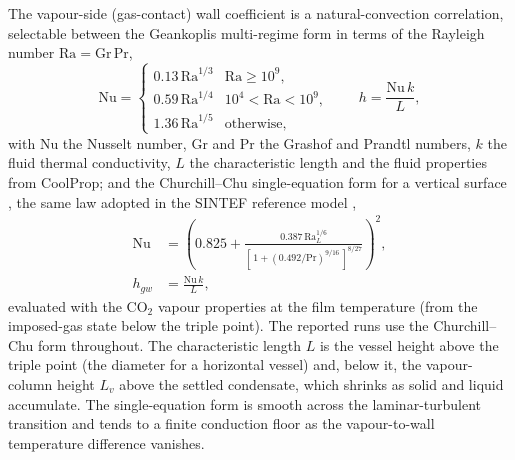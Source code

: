 \documentclass[5p,authoryear]{elsarticle}
\begin{document}
The vapour-side (gas-contact) wall coefficient is a natural-convection correlation, selectable
between the Geankoplis multi-regime form \citep{Geankoplis1993} in terms of the Rayleigh number
$\mathrm{Ra} = \mathrm{Gr}\,\mathrm{Pr}$,
\begin{equation}
\label{eq:geankoplis}
\mathrm{Nu} =
\begin{cases}
0.13\,\mathrm{Ra}^{1/3} & \mathrm{Ra} \ge 10^9,\\[2pt]
0.59\,\mathrm{Ra}^{1/4} & 10^4 < \mathrm{Ra} < 10^9,\\[2pt]
1.36\,\mathrm{Ra}^{1/5} & \text{otherwise},
\end{cases}
\qquad h = \frac{\mathrm{Nu}\,k}{L},
\end{equation}
with $\mathrm{Nu}$ the Nusselt number, $\mathrm{Gr}$ and $\mathrm{Pr}$ the Grashof and Prandtl
numbers, $k$ the fluid thermal conductivity, $L$ the characteristic length and the fluid properties
from CoolProp; and the Churchill--Chu single-equation form for a vertical surface
\citep{ChurchillChu1975}, the same law adopted in the SINTEF reference model \citep{Hoydalsvik2026},
\begin{equation}
\label{eq:churchill}
\begin{aligned}
\mathrm{Nu} &= \left(0.825 +
\frac{0.387\,\mathrm{Ra}_{L}^{1/6}}{[\,1 + (0.492/\mathrm{Pr})^{9/16}\,]^{8/27}}\right)^2, \\
h_{gw} &= \frac{\mathrm{Nu}\,k}{L},
\end{aligned}
\end{equation}
evaluated with the CO$_2$ vapour properties at the film temperature (from the imposed-gas state below
the triple point). The reported runs use the Churchill--Chu form throughout. The characteristic length $L$ is the vessel
height above the triple point (the diameter for a horizontal vessel) and, below it, the vapour-column
height $L_v$ above the settled condensate, which shrinks as solid and liquid accumulate. The
single-equation form is smooth across the laminar-turbulent transition and tends to a finite
conduction floor as the vapour-to-wall temperature difference vanishes.
\end{document}
